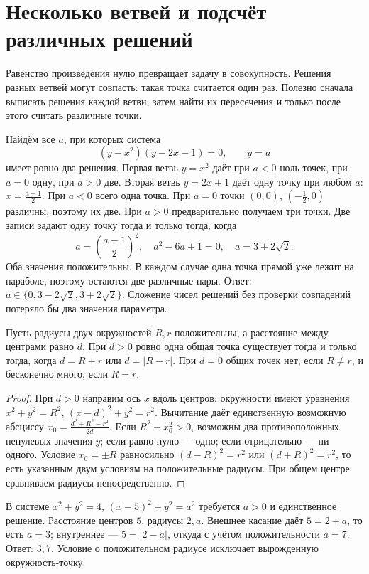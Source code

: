 \section{Несколько ветвей и подсчёт различных решений}
Равенство произведения нулю превращает задачу в совокупность. Решения разных ветвей могут совпасть: такая точка считается один раз. Полезно сначала выписать решения каждой ветви, затем найти их пересечения и только после этого считать различные точки.
\begin{example}\label{ex:review-ege-exam-parameters-1}
Найдём все \(a\), при которых система
\[
(y-x^2)(y-2x-1)=0,\qquad y=a
\]
имеет ровно два решения. Первая ветвь \(y=x^2\) даёт при \(a<0\) ноль точек, при \(a=0\) одну, при \(a>0\) две. Вторая ветвь \(y=2x+1\) даёт одну точку при любом \(a\): \(x=\frac{a-1}{2}\).
При \(a<0\) всего одна точка. При \(a=0\) точки \((0,0)\), \((-\frac12,0)\) различны, поэтому их две. При \(a>0\) предварительно получаем три точки. Две записи задают одну точку тогда и только тогда, когда
\[
a=\left(\frac{a-1}{2}\right)^2,
\quad a^2-6a+1=0,
\quad a=3\pm2\sqrt2.
\]
Оба значения положительны. В каждом случае одна точка прямой уже лежит на параболе, поэтому остаются две различные пары. Ответ: \(a\in\{0,3-2\sqrt2,3+2\sqrt2\}\). Сложение чисел решений без проверки совпадений потеряло бы два значения параметра.
\end{example}

\begin{theorem}
Пусть радиусы двух окружностей \(R,r\) положительны, а расстояние между центрами равно \(d\). При \(d>0\) ровно одна общая точка существует тогда и только тогда, когда \(d=R+r\) или \(d=|R-r|\). При \(d=0\) общих точек нет, если \(R\ne r\), и бесконечно много, если \(R=r\).
\end{theorem}
\begin{proof}
При \(d>0\) направим ось \(x\) вдоль центров: окружности имеют уравнения \(x^2+y^2=R^2\), \((x-d)^2+y^2=r^2\). Вычитание даёт единственную возможную абсциссу \(x_0=\frac{d^2+R^2-r^2}{2d}\). Если \(R^2-x_0^2>0\), возможны два противоположных ненулевых значения \(y\); если равно нулю — одно; если отрицательно — ни одного. Условие \(x_0=\pm R\) равносильно \((d-R)^2=r^2\) или \((d+R)^2=r^2\), то есть указанным двум условиям на положительные радиусы. При общем центре сравниваем радиусы непосредственно.
\end{proof}
\begin{example}\label{ex:review-ege-exam-parameters-2}
В системе \(x^2+y^2=4\), \((x-5)^2+y^2=a^2\) требуется \(a>0\) и единственное решение. Расстояние центров \(5\), радиусы \(2,a\). Внешнее касание даёт \(5=2+a\), то есть \(a=3\); внутреннее — \(5=|2-a|\), откуда с учётом положительности \(a=7\). Ответ: \(3,7\). Условие о положительном радиусе исключает вырожденную окружность-точку.
\end{example}

